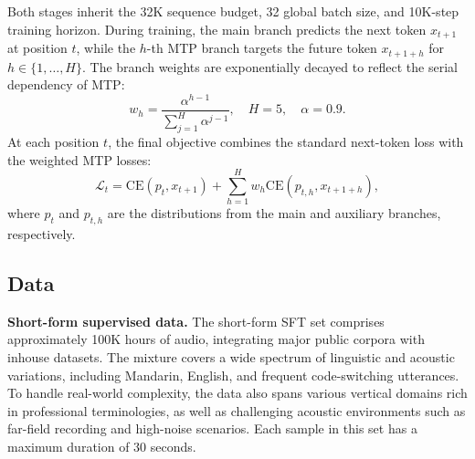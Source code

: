 Both stages inherit the 32K sequence budget, 32 global batch size, and 10K-step training horizon.
During training, the main branch predicts the next token $x_{t+1}$ at position $t$, while the $h$-th MTP branch targets the future token $x_{t+1+h}$ for $h\in\{1,\ldots,H\}$. The branch weights are exponentially decayed to reflect the serial dependency of MTP:
\[
w_h = \frac{\alpha^{h-1}}{\sum_{j=1}^{H}\alpha^{j-1}}, \quad H=5, \quad \alpha=0.9.
\]
At each position $t$, the final objective combines the standard next-token loss with the weighted MTP losses:
\[
\mathcal{L}_t = \mathrm{CE}(p_t, x_{t+1}) + \sum_{h=1}^{H} w_h \mathrm{CE}(p_{t,h}, x_{t+1+h}),
\]
where $p_t$ and $p_{t,h}$ are the distributions from the main and auxiliary branches, respectively.


\subsection{Data}
\textbf{Short-form supervised data.} The short-form SFT set comprises approximately 100K hours of audio, integrating major public corpora with inhouse datasets. The mixture covers a wide spectrum of linguistic and acoustic variations, including Mandarin, English, and frequent code-switching utterances. To handle real-world complexity, the data also spans various vertical domains rich in professional terminologies, as well as challenging acoustic environments such as far-field recording and high-noise scenarios. Each sample in this set has a maximum duration of 30 seconds.


